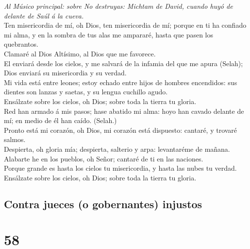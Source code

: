  \emph{Al Músico principal: sobre No destruyas: Michtam de
David, cuando huyó de delante de Saúl á la cueva.}\\
Ten misericordia de mí, oh Dios, ten misericordia de mí; porque en ti ha
confiado mi alma, y en la sombra de tus alas me ampararé, hasta que
pasen los quebrantos.\\
 Clamaré al Dios Altísimo, al Dios que me favorece.\\
 El enviará desde los cielos, y me salvará de la infamia del
que me apura (Selah); Dios enviará su misericordia y su verdad.\\
 Mi vida está entre leones; estoy echado entre hijos de
hombres encendidos: sus dientes son lanzas y saetas, y su lengua
cuchillo agudo.\\
 Ensálzate sobre los cielos, oh Dios; sobre toda la tierra
tu gloria.\\
 Red han armado á mis pasos; hase abatido mi alma: hoyo han
cavado delante de mí; en medio de él han caído. (Selah.)\\
 Pronto está mi corazón, oh Dios, mi corazón está dispuesto:
cantaré, y trovaré salmos.\\
 Despierta, oh gloria mía; despierta, salterio y arpa:
levantaréme de mañana.\\
 Alabarte he en los pueblos, oh Señor; cantaré de ti en las
naciones.\\
 Porque grande es hasta los cielos tu misericordia, y hasta
las nubes tu verdad.\\
 Ensálzate sobre los cielos, oh Dios; sobre toda la tierra
tu gloria.

\hypertarget{contra-jueces-o-gobernantes-injustos}{%
\subsection{Contra jueces (o gobernantes)
injustos}\label{contra-jueces-o-gobernantes-injustos}}

\hypertarget{section-57}{%
\section{58}\label{section-57}}

